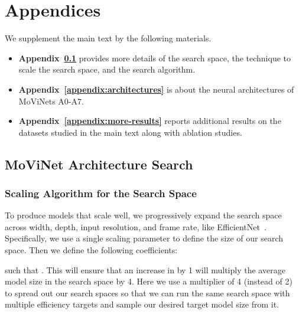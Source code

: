 \documentclass[final]{cvpr}
\newcommand{\ournet}{MoViNet\xspace} \newcommand{\ournets}{\ournet{}s\xspace}
\begin{document}
{\small


}

\newpage
\section*{Appendices} \label{sec:appendix}
\renewcommand{\thesubsection}{\Alph{subsection}}

We supplement the main text by the following materials. 
\begin{itemize}
    \item {\bf Appendix~\ref{appendix:search-space}} provides more details of the search space, the technique to scale the search space, and the search algorithm.
    \item {\bf Appendix~\ref{appendix:architectures}} is about the neural architectures of \ournets A0-A7. 
    \item {\bf Appendix~\ref{appendix:more-results}} reports additional results on the datasets studied in the main text along with ablation studies.
\end{itemize}





\subsection{\ournet Architecture Search} \label{appendix:search-space}










\subsubsection{Scaling Algorithm for the Search Space}

To produce models that scale well, we progressively expand the search space across width, depth, input resolution, and frame rate, like EfficientNet~\cite{tan2019efficientnet}.
Specifically, we use a single scaling parameter  to define the size of our search space.
Then we define the following coefficients:

such that .
This will ensure that an increase in  by 1 will multiply the average model size in the search space by 4.
Here we use a multiplier of 4 (instead of 2) to spread out our search spaces so that we can run the same search space with multiple efficiency targets and sample our desired target model size from it.
\end{document}
